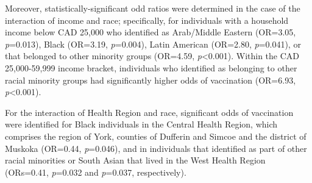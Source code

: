 \documentclass[
  letterpaper,
  DIV=11,
  numbers=noendperiod]{scrartcl}
\begin{document}
Moreover, statistically-significant odd ratios were determined in the
case of the interaction of income and race; specifically, for
individuals with a household income below CAD 25,000 who identified as
Arab/Middle Eastern (OR=3.05, \emph{p}=0.013), Black (OR=3.19,
\emph{p}=0.004), Latin American (OR=2.80, \emph{p}=0.041), or that
belonged to other minority groups (OR=4.59, \emph{p}\textless0.001).
Within the CAD 25,000-59,999 income bracket, individuals who identified
as belonging to other racial minority groups had significantly higher
odds of vaccination (OR=6.93, \emph{p}\textless0.001).

For the interaction of Health Region and race, significant odds of
vaccination were identified for Black individuals in the Central Health
Region, which comprises the region of York, counties of Dufferin and
Simcoe and the district of Muskoka (OR=0.44, \emph{p}=0.046), and in
individuals that identified as part of other racial minorities or South
Asian that lived in the West Health Region (ORs=0.41, \emph{p}=0.032 and
\emph{p}=0.037, respectively).

\footnotesize
\renewcommand{\arraystretch}{0.5}
\end{document}
